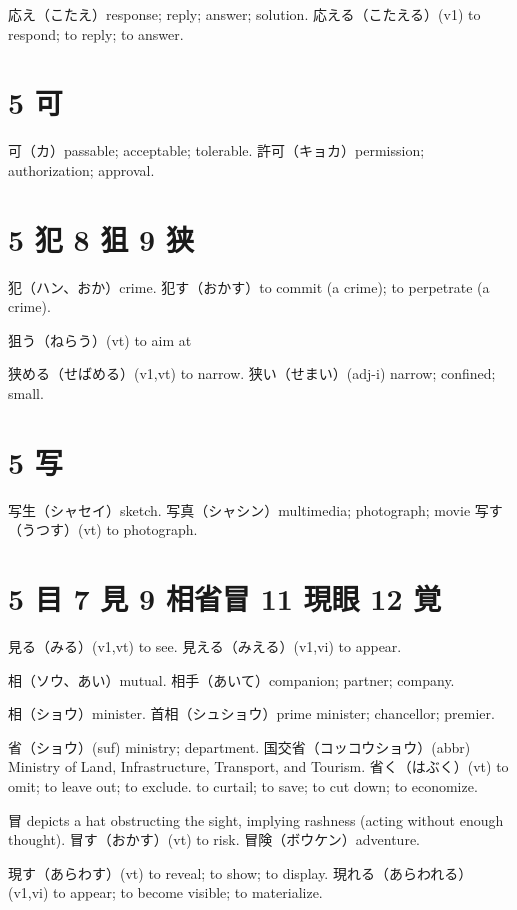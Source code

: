 応え（こたえ）response; reply; answer; solution.
応える（こたえる）(v1) to respond; to reply; to answer.

\section{5 可}

可（カ）passable; acceptable; tolerable.
許可（キョカ）permission; authorization; approval.

\section{5 犯 8 狙 9 狭}

犯（ハン、おか）crime.
犯す（おかす）to commit (a crime); to perpetrate (a crime).

狙う（ねらう）(vt) to aim at

狭める（せばめる）(v1,vt) to narrow.
狭い（せまい）(adj-i) narrow; confined; small.

\section{5 写}

写生（シャセイ）sketch.
写真（シャシン）multimedia; photograph; movie
写す（うつす）(vt) to photograph.

\section{5 目 7 見 9 相省冒 11 現眼 12 覚}

見る（みる）(v1,vt) to see.
見える（みえる）(v1,vi) to appear.

相（ソウ、あい）mutual.
相手（あいて）companion; partner; company.

相（ショウ）minister.
首相（シュショウ）prime minister; chancellor; premier.

省（ショウ）(suf) ministry; department.
国交省（コッコウショウ）(abbr)
Ministry of Land, Infrastructure, Transport, and Tourism.
省く（はぶく）(vt)
to omit; to leave out; to exclude.
to curtail; to save; to cut down; to economize.

冒 depicts a hat obstructing the sight, implying rashness
(acting without enough thought).
冒す（おかす）(vt) to risk.
冒険（ボウケン）adventure.

現す（あらわす）(vt) to reveal; to show; to display.
現れる（あらわれる）(v1,vi) to appear; to become visible; to materialize.

